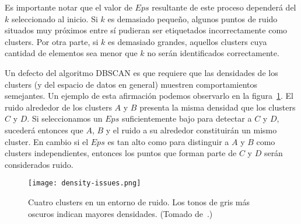 
Es importante notar que el valor de $Eps$ resultante de este proceso dependerá del $k$ seleccionado al inicio.
Si $k$ es demasiado pequeño, algunos puntos de ruido situados muy próximos entre sí pudieran ser etiquetados incorrectamente como clusters.
Por otra parte, si $k$ es demasiado grandes, aquellos clusters cuya cantidad de elementos sea menor que $k$ no serán identificados correctamente.

Un defecto del algoritmo DBSCAN es que requiere que las densidades de los clusters (y del espacio de datos en general) muestren comportamientos semejantes.
Un ejemplo de esta afirmación podemos observarlo en la figura~\ref{img:density-issues}.
El ruido alrededor de los clusters $A$ y $B$ presenta la misma densidad que los clusters $C$ y $D$.
Si seleccionamos un $Eps$ suficientemente bajo para detectar a $C$ y $D$, sucederá entonces que $A$, $B$ y el ruido a su alrededor constituirán un mismo cluster.
En cambio si el $Eps$ es tan alto como para distinguir a $A$ y $B$ como clusters independientes, entonces los puntos que forman parte de $C$ y $D$ serán considerados ruido.

\begin{figure}[!h]
    \centering
    \texttt{[image: density-issues.png]}
    \caption{Cuatro clusters en un entorno de ruido.
    Los tonos de gris más oscuros indican mayores densidades. (Tomado de~\cite{Tan05}.)}
    \label{img:density-issues}
\end{figure}

